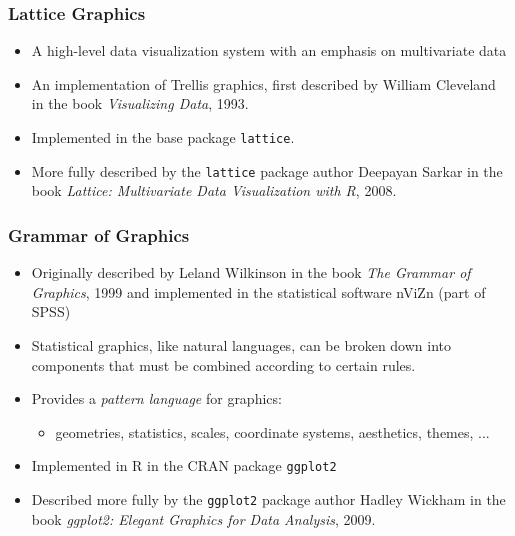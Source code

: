 \documentclass[xcolor=svgnames]{beamer}
\newcommand{\code}[1]{\texttt{#1}}
\begin{document}
\begin{frame}
  \frametitle{Lattice Graphics}

  \begin{itemize}
  \item A high-level data visualization system with an emphasis on
     multivariate data
  \item An implementation of Trellis graphics, first described
     by William Cleveland in the book {\em Visualizing Data}, 1993.
  \item Implemented in the base package \code{lattice}.
  \item More fully described by the \code{lattice} package author
      Deepayan Sarkar in the book {\em Lattice: Multivariate Data
      Visualization with R}, 2008.  
\end{itemize}

\end{frame}

\begin{frame}
  \frametitle{Grammar of Graphics}

  \begin{itemize}
  \item Originally described by Leland Wilkinson in the book {\em The
    Grammar of Graphics}, 1999 and implemented in the statistical
    software nViZn (part of SPSS)
  \item Statistical graphics, like natural languages, can be broken down
   into components that must be combined according to certain rules.
  \item Provides a {\em pattern language} for graphics:
     \begin{itemize}
     \item geometries, statistics, scales, coordinate systems,
          aesthetics, themes, ...
     \end{itemize}
   \item Implemented in R in the CRAN package \code{ggplot2}
   \item Described more fully by the \code{ggplot2} package author Hadley
      Wickham in the book {\em ggplot2: Elegant Graphics for Data Analysis},
      2009.
   \end{itemize}

\end{frame}
\end{document}
